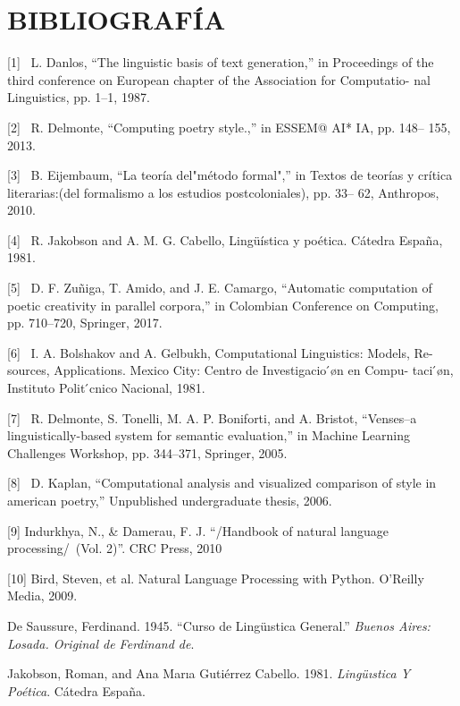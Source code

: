 \documentclass[twoside]{article}
\begin{document}
\section{BIBLIOGRAFÍA}
\label{sec:org926dff5}

[1]  L. Danlos, “The linguistic basis of text generation,” in
Proceedings of the third conference on European chapter of the
Association for Computatio- nal Linguistics, pp. 1--1, 1987.

[2]  R. Delmonte, “Computing poetry style.,” in ESSEM@ AI* IA, pp. 148--
155, 2013.

[3]  B. Eijembaum, “La teoría del"método formal",” in Textos de teorías
y crítica literarias:(del formalismo a los estudios postcoloniales), pp.
33-- 62, Anthropos, 2010.

[4]  R. Jakobson and A. M. G. Cabello, Lingüística y poética. Cátedra
España, 1981.

[5]  D. F. Zuñiga, T. Amido, and J. E. Camargo, “Automatic computation
of poetic creativity in parallel corpora,” in Colombian Conference on
Computing, pp. 710--720, Springer, 2017.

[6]  I. A. Bolshakov and A. Gelbukh, Computational Linguistics: Models,
Re- sources, Applications. Mexico City: Centro de Investigacio ́øn en
Compu- taci ́øn, Instituto Polit ́cnico Nacional, 1981.

[7]  R. Delmonte, S. Tonelli, M. A. P. Boniforti, and A. Bristot,
“Venses--a linguistically-based system for semantic evaluation,” in
Machine Learning Challenges Workshop, pp. 344--371, Springer, 2005.

[8]  D. Kaplan, “Computational analysis and visualized comparison of
style in american poetry,” Unpublished undergraduate thesis, 2006.

[9] Indurkhya, N., \& Damerau, F. J. “/Handbook of natural language
processing/ (Vol. 2)”. CRC Press, 2010


[10] Bird, Steven, et al. Natural Language Processing with Python.
O'Reilly Media, 2009.




\hypertarget{citeproc_bib_item_1}{De Saussure, Ferdinand. 1945. “Curso de Lingü\’ıstica General.” \textit{Buenos Aires: Losada. Original de Ferdinand de}.}

\hypertarget{citeproc_bib_item_2}{Jakobson, Roman, and Ana Mar\’ıa Gutiérrez Cabello. 1981. \textit{Lingü\’ıstica Y Poética}. Cátedra España.}
\end{document}
